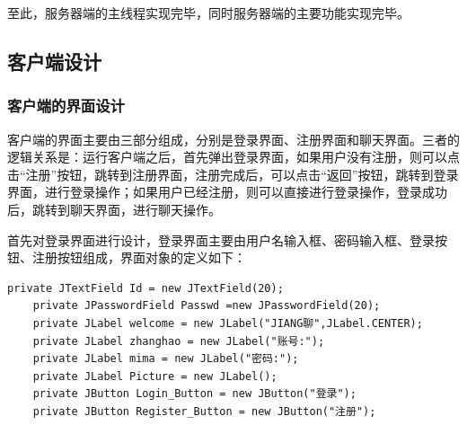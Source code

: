 \documentclass[UTF8,12pt]{article}
\begin{document}
至此，服务器端的主线程实现完毕，同时服务器端的主要功能实现完毕。

\subsection{客户端设计}
\subsubsection{客户端的界面设计}
客户端的界面主要由三部分组成，分别是登录界面、注册界面和聊天界面。三者的逻辑关系是：运行客户端之后，首先弹出登录界面，如果用户没有注册，则可以点击“注册”按钮，跳转到注册界面，注册完成后，可以点击“返回”按钮，跳转到登录界面，进行登录操作；如果用户已经注册，则可以直接进行登录操作，登录成功后，跳转到聊天界面，进行聊天操作。

首先对登录界面进行设计，登录界面主要由用户名输入框、密码输入框、登录按钮、注册按钮组成，界面对象的定义如下：
\begin{lstlisting}[title=登录界面对象的定义,frame=shadowbox]
    private JTextField Id = new JTextField(20);
    private JPasswordField Passwd =new JPasswordField(20);
    private JLabel welcome = new JLabel("JIANG聊",JLabel.CENTER);
    private JLabel zhanghao = new JLabel("账号:");
    private JLabel mima = new JLabel("密码:");
    private JLabel Picture = new JLabel();
    private JButton Login_Button = new JButton("登录");
    private JButton Register_Button = new JButton("注册");
\end{lstlisting}
\end{document}

